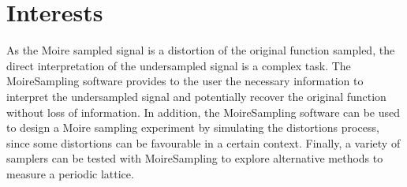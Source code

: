 \documentclass[
11pt,
a4paper,
oneside,
onecolumn,
final %
]{article}
\begin{document}
\section{Interests}

As the Moire sampled signal is a distortion of the original function sampled, the direct interpretation of the undersampled signal is a complex task. The MoireSampling software provides to the user the necessary information to interpret the undersampled signal and potentially recover the original function without loss of information. In addition, the MoireSampling software can be used to design a Moire sampling experiment by simulating the distortions process, since some distortions can be favourable in a certain context. Finally, a variety of samplers can be tested with MoireSampling to explore alternative methods to measure a periodic lattice. 



\end{document}
